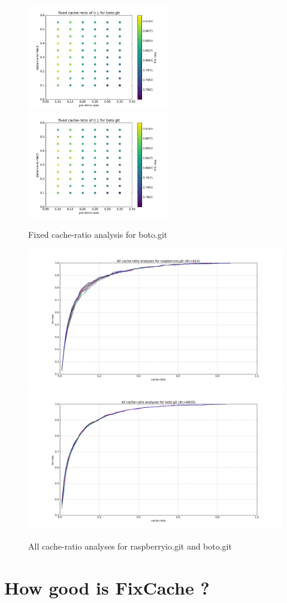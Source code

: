 \documentclass[12pt,twoside,notitlepage]{report}
\newcommand{\fxch}{FixCache }
\begin{document}
\begin{figure}[t!]
\includegraphics[width=0.55\textwidth]{figure_5-1.png}
\includegraphics[width=0.55\textwidth]{figure_5-1.png}
\caption{Fixed cache-ratio analysis for boto.git}
\label{fig:fixed_cache}
\end{figure}
\begin{figure}[t!]
\includegraphics[width=1.0\textwidth]{figure_4-1.png}
\includegraphics[width=1.0\textwidth]{figure_4-2.png}
\caption{All cache-ratio analyses for raspberryio.git and boto.git}
\label{fig:plot_all}
\end{figure}
\clearpage
\section{How good is \fxch?}\label{windowedrep}

\end{document}
